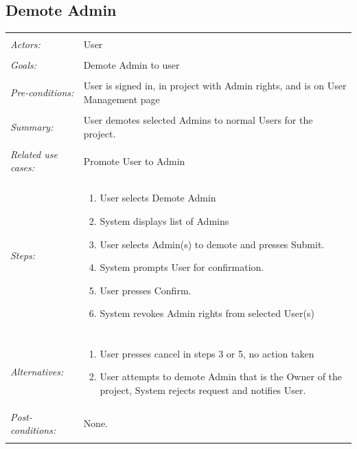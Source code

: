 \documentclass[11pt]{report}
\begin{document}
\subsection{Demote Admin}
\begin{tabular}{ p{2cm} p{12cm} }
    \hline
    \\
    \textit{Actors:} & User \\ 
    \\
    \textit{Goals:} & Demote Admin to user \\
    \\
    \textit{Pre-conditions:} & User is signed in, in project with Admin rights, and is on User Management page \\
    \\
    \textit{Summary:} & User demotes selected Admins to normal Users for the project. \\ 
    \\
    \textit{Related use cases:} & Promote User to Admin \\ 
    \\
    \textit{Steps:} & \begin{enumerate}
        \item User selects Demote Admin
        \item System displays list of Admins
        \item User selects Admin(s) to demote and presses Submit.
        \item System prompts User for confirmation.
        \item User presses Confirm.
        \item System revokes Admin rights from selected User(s)
    \end{enumerate} \\
    \\
    \textit{Alternatives:} & \begin{enumerate}
        \item User presses cancel in steps 3 or 5, no action taken
        \item User attempts to demote Admin that is the Owner of the project, System rejects request and notifies User.
    \end{enumerate}
    \\
    \textit{Post-conditions:} & None. \\
    \\
    \hline
\end{tabular}
\end{document}
